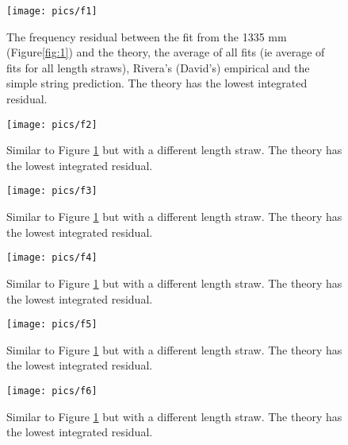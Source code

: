 \documentclass[twoside]{article}
\begin{document}
\begin{multicols}{2}
\begin{figure}[H]
	\texttt{[image: pics/f1]}
	\caption{The frequency residual between the fit from the 1335 mm (Figure\ref{fig:1}) and the theory, the average of all fits (ie average of fits for all length straws), Rivera's (David's) empirical  and the simple string prediction. The theory has the lowest integrated residual.
	}
	\label{fig:1f}
\end{figure}
\begin{figure}[H]
	\texttt{[image: pics/f2]}
	\caption{Similar to Figure \ref{fig:1f} but with a different length straw. The theory has the lowest integrated residual.
	}
\end{figure}
\begin{figure}[H]
	\texttt{[image: pics/f3]}
	\caption{Similar to Figure \ref{fig:1f} but with a different length straw. The theory has the lowest integrated residual.
	}
\end{figure}
\begin{figure}[H]
	\texttt{[image: pics/f4]}
	\caption{Similar to Figure \ref{fig:1f} but with a different length straw. The theory has the lowest integrated residual.
	}
\end{figure}
\begin{figure}[H]
	\texttt{[image: pics/f5]}
	\caption{Similar to Figure \ref{fig:1f} but with a different length straw. The theory has the lowest integrated residual.
	}
\end{figure}
\begin{figure}[H]
	\texttt{[image: pics/f6]}
	\caption{Similar to Figure \ref{fig:1f} but with a different length straw. The theory has the lowest integrated residual.
	}
\end{figure}




\end{multicols}
\end{document}
